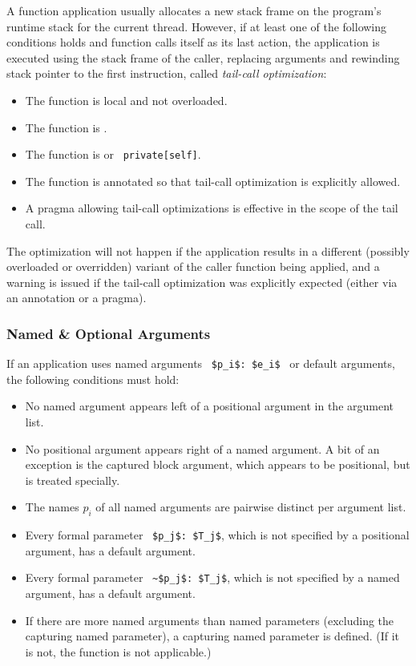 A function application usually allocates a new stack frame on the program's runtime stack for the current thread. However, if at least one of the following conditions holds and function calls itself as its last action, the application is executed using the stack frame of the caller, replacing arguments and rewinding stack pointer to the first instruction, called {\em tail-call optimization}:
\begin{itemize}
\item The function is local and not overloaded. 
\item The function is . 
\item The function is  or ~\lstinline!private[self]!. 
\item The function is annotated so that tail-call optimization is explicitly allowed. 
\item A pragma allowing tail-call optimizations is effective in the scope of the tail call. 
\end{itemize}
The optimization will not happen if the application results in a different (possibly overloaded or overridden) variant of the caller function being applied, and a warning is issued if the tail-call optimization was explicitly expected (either via an annotation or a pragma). 





\subsubsection{Named \& Optional Arguments}
\label{sec:named-optional-arguments}

If an application uses named arguments ~\lstinline!$p_i$: $e_i$!~ or default arguments, the following conditions must hold:
\begin{itemize}
\item No named argument appears left of a positional argument in the argument list. 
\item No positional argument appears right of a named argument. A bit of an exception is the captured block argument, which appears to be positional, but is treated specially. 
\item The names $p_i$ of all named arguments are pairwise distinct per argument list.
\item Every formal parameter ~\lstinline!$p_j$: $T_j$!, which is not specified by a positional argument, has a default argument. 
\item Every formal parameter ~\lstinline!~$p_j$: $T_j$!, which is not specified by a named argument, has a default argument. 
\item If there are more named arguments than named parameters (excluding the capturing named parameter), a capturing named parameter is defined. (If it is not, the function is not applicable.)
\end{itemize}

